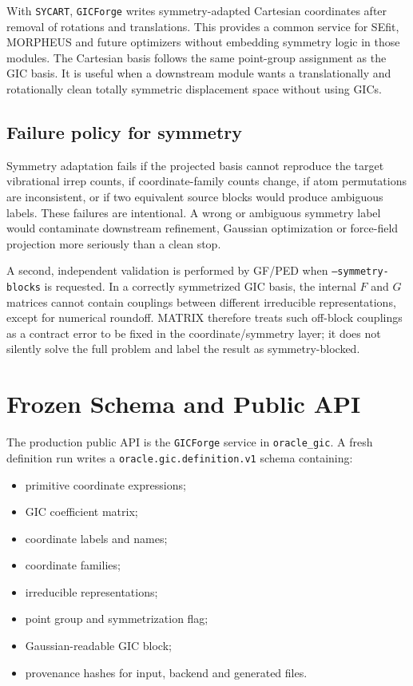\documentclass[11pt]{article}
\newcommand{\program}{\texttt{GICForge}}
\begin{document}
With \texttt{SYCART}, \program{} writes symmetry-adapted Cartesian coordinates
after removal of rotations and translations.  This provides a common service
for SEfit, MORPHEUS and future optimizers without embedding symmetry logic in
those modules.  The Cartesian basis follows the same point-group assignment as
the GIC basis.  It is useful when a downstream module wants a translationally
and rotationally clean totally symmetric displacement space without using GICs.

\subsection{Failure policy for symmetry}

Symmetry adaptation fails if the projected basis cannot reproduce the target
vibrational irrep counts, if coordinate-family counts change, if atom
permutations are inconsistent, or if two equivalent source blocks would produce
ambiguous labels.  These failures are intentional.  A wrong or ambiguous
symmetry label would contaminate downstream refinement, Gaussian optimization
or force-field projection more seriously than a clean stop.

\noindent
A second, independent validation is performed by GF/PED when
\texttt{--symmetry-blocks} is requested.  In a correctly symmetrized GIC basis,
the internal \(F\) and \(G\) matrices cannot contain couplings between
different irreducible representations, except for numerical roundoff.  MATRIX
therefore treats such off-block couplings as a contract error to be fixed in
the coordinate/symmetry layer; it does not silently solve the full problem and
label the result as symmetry-blocked.

\section{Frozen Schema and Public API}

The production public API is the \texttt{GICForge} service in
\texttt{oracle\_gic}.  A fresh definition run writes a
\texttt{oracle.gic.definition.v1} schema containing:

\begin{itemize}
  \item primitive coordinate expressions;
  \item GIC coefficient matrix;
  \item coordinate labels and names;
  \item coordinate families;
  \item irreducible representations;
  \item point group and symmetrization flag;
  \item Gaussian-readable GIC block;
  \item provenance hashes for input, backend and generated files.
\end{itemize}
\end{document}
